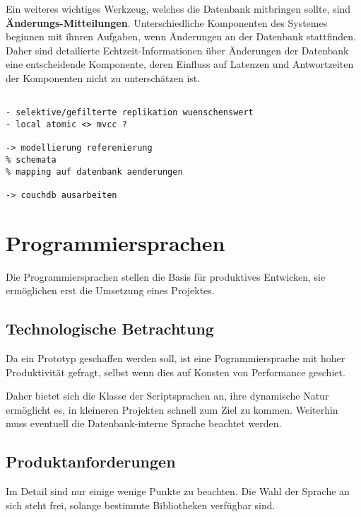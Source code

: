 Ein weiteres wichtiges Werkzeug, welches die Datenbank mitbringen sollte, sind \textbf{\"Anderungs-Mitteilungen}.
Unterschiedliche Komponenten des Systemes beginnen mit ihnren Aufgaben, wenn \"Anderungen an der Datenbank stattfinden.
Daher sind detailierte Echtzeit-Informationen \"uber \"Anderungen der Datenbank eine entscheidende Komponente,
deren Einfluss auf Latenzen und Antwortzeiten der Komponenten nicht zu untersch\"atzen ist.


\begin{verbatim}

- selektive/gefilterte replikation wuenschenswert
- local atomic <> mvcc ?

-> modellierung referenierung
% schemata
% mapping auf datenbank aenderungen

-> couchdb ausarbeiten

\end{verbatim}


\section{Programmiersprachen}

Die Programmiersprachen stellen die Basis f\"ur produktives Entwicken,
sie erm\"oglichen erst die Umsetzung eines Projektes.

\subsection{Technologische Betrachtung}

Da ein Prototyp geschaffen werden soll,
ist eine Pogrammiersprache mit hoher Produktivit\"at gefragt,
selbst wenn dies auf Konsten von Performance geschiet.

Daher bietet sich die Klasse der Scriptsprachen an,
ihre dynamische Natur erm\"oglicht es,
in kleineren Projekten schnell zum Ziel zu kommen.
Weiterhin muss eventuell die Datenbank-interne Sprache beachtet werden.


\subsection{Produktanforderungen}

Im Detail sind nur einige wenige Punkte zu beachten.
Die Wahl der Sprache an sich steht frei,
solange bestimmte Bibliotheken verf\"ugbar sind.


